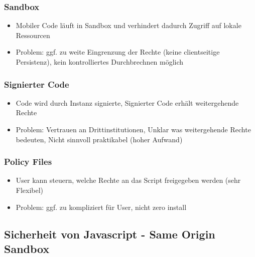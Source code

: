\documentclass{article} %
\begin{document}
	\subsubsection{Sandbox}
	\begin{itemize}
		\item Mobiler Code läuft in Sandbox und verhindert dadurch Zugriff auf lokale Ressourcen 
		\item Problem: ggf. zu weite Eingrenzung der Rechte (keine clientseitige Persistenz), kein kontrolliertes Durchbrechnen möglich
	\end{itemize}
	\subsubsection{Signierter Code}
	\begin{itemize}
		\item Code wird durch Instanz signierte, Signierter Code erhält weitergehende Rechte
		\item Problem: Vertrauen an Drittinstitutionen, Unklar was weitergehende Rechte bedeuten, Nicht sinnvoll praktikabel (hoher Aufwand)
	\end{itemize}
	\subsubsection{Policy Files}
	\begin{itemize}
		\item User kann steuern, welche Rechte an das Script freigegeben werden (sehr Flexibel)
		\item Problem: ggf. zu kompliziert für User, nicht zero install
	\end{itemize}
	\subsection{Sicherheit von Javascript - Same Origin Sandbox}
\end{document}
